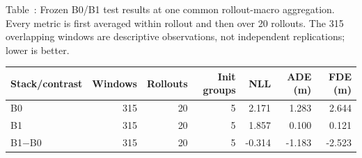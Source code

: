 \begin{center}
\label{tab:finetune-b0-b1-rollout-macro}
\small
Table~\thetable: Frozen B0/B1 test results at one common rollout-macro aggregation. Every metric is first averaged within rollout and then over 20 rollouts. The 315 overlapping windows are descriptive observations, not independent replications; lower is better.\par\smallskip
\begin{tabular}{@{}lrrrrrr@{}}
\toprule
Stack/contrast & Windows & Rollouts & Init groups & NLL & ADE (m) & FDE (m) \\
\midrule
B0 & 315 & 20 & 5 & 2.171 & 1.283 & 2.644 \\
B1 & 315 & 20 & 5 & 1.857 & 0.100 & 0.121 \\
\midrule
B1$-$B0 & 315 & 20 & 5 & -0.314 & -1.183 & -2.523 \\
\bottomrule
\end{tabular}
\end{center}
